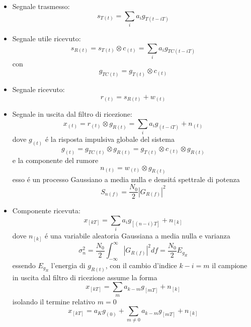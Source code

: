             \begin{itemize}
                \item {Segnale trasmesso:
                    \[
                        s_{T(t)} = \sum_{i}a_ig_{T(t-iT)}  
                    \]
                }
                \item {Segnale utile ricevuto:
                    \[
                        s_{R(t)} = s_{T(t)} \otimes c_{(t)} = \sum_{i}a_ig_{TC(t-iT)}  
                    \]
                    con 
                    \[
                        g_{TC(t)} = g_{T(t)} \otimes c_{(t)} 
                    \]
                }
                \item {Segnale ricevuto:
                    \[
                        r_{(t)} = s_{R(t)} + w_{(t)}  
                    \]
                }
                \item {Segnale in uscita dal filtro di ricezione:
                    \[
                        x_{(t)} = r_{(t)} \otimes g_{R(t)} = \sum_{i}a_ig_{(t-iT)}+n_{(t)}  
                    \]
                    dove $g_{(t)}$ é la risposta impulsiva globale del sistema
                    \[
                        g_{(t)} = g_{TC(t)} \otimes g_{R(t)} = g_{T(t)} \otimes c_{(t)} \otimes g_{R(t)}
                    \]
                    e la componente del rumore 
                    \[
                        n_{(t)} = w_{(t)} \otimes g_{R(t)}    
                    \]
                    esso é un processo Gaussiano a media nulla e densitá spettrale di potenza 
                    \[
                        S_{n(f)} = \frac{N_0}{2} \left|G_{R(f)}\right|^2  
                    \]
                }
                \item {Componente ricevuta:
                    \[
                        x_{[kT]} = \sum_{i}a_ig_{[(n-i)T]}+n_{[k]}  
                    \]
                    dove $n_{[k]}$ é una variabile aleatoria Gaussiana a media nulla e varianza 
                    \[
                        \sigma_n^2 = \frac{N_0}{2} \int_{-\infty}^{\infty}\left|G_{R(f)}\right|^2 df =\frac{N_0}{2} E_{g_R} 
                    \]
                    essendo $E_{g_R}$ l'energia di $g_{R(t)}$, con il cambio d'indice $k-i = m$ il campione in uscita dal filtro di ricezione
                    assume la forma 
                    \[
                        x_{[kT]} = \sum_{m}a_{k-m}g_{[mT]}+n_{[k]}
                    \]
                    isolando il termine relativo $m=0$
                    \[
                        x_{[kT]} = a_Kg_{(0)} + \sum_{m\neq 0}a_{k-m}g_{[mT]}+n_{[k]}      
\]}
\end{itemize}
